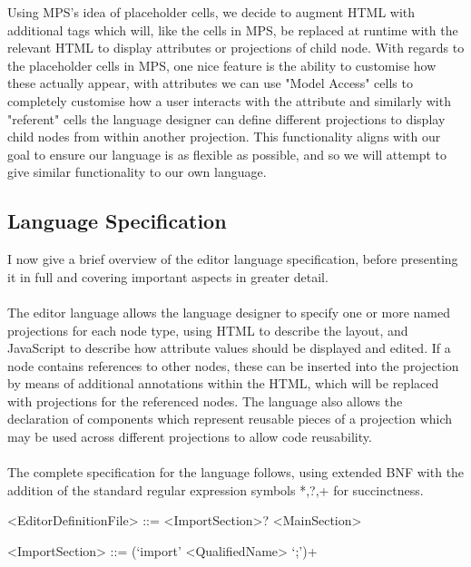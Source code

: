 \documentclass{article}
\begin{document}
{\begin{enumerate}
\end{enumerate}
Using MPS's idea of placeholder cells, we decide to augment HTML with additional tags which will, like the cells in MPS, be replaced at runtime with the relevant HTML to display attributes or projections of child node. With regards to the placeholder cells in MPS, one nice feature is the ability to customise how these actually appear, with attributes we can use "Model Access" cells to completely customise how a user interacts with the attribute and similarly with "referent" cells the language designer can define different projections to display child nodes from within another projection. This functionality aligns with our goal to ensure our language is as flexible as possible, and so we will attempt to give similar functionality to our own language.

\subsection{Language Specification}
I now give a brief overview of the editor language specification, before presenting it in full and covering important aspects in greater detail. 
\\
\\
The editor language allows the language designer to specify one or more named projections for each node type, using HTML to describe the layout, and JavaScript to describe how attribute values should be displayed and edited. If a node contains references to other nodes, these can be inserted into the projection by means of additional annotations within the HTML, which will be replaced with projections for the referenced nodes. The language also allows the declaration of components which represent reusable pieces of a projection which may be used across different projections to allow code reusability. 
\\
\\
The complete specification for the language follows, using extended BNF with the addition of the standard regular expression symbols *,?,+ for succinctness.

\setlength{\grammarparsep}{12pt plus 1pt minus 1pt} %
\setlength{\grammarindent}{5em} %

\begin{grammar}

<EditorDefinitionFile> ::= <ImportSection>? <MainSection>

<ImportSection> ::= (`import' <QualifiedName> `;')+ 


\end{grammar}}
\end{document}
